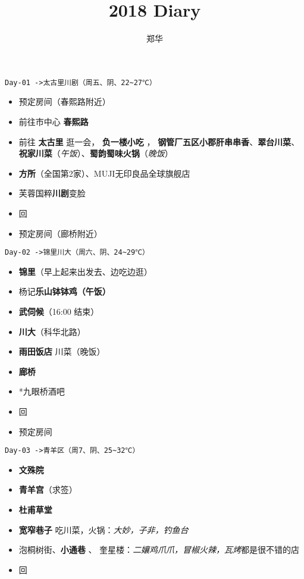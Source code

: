 \documentclass[UTF8,a4paper,8pt]{ctexart}
\author{郑华}
\title{2018 Diary}
\begin{document}
 



 \newpage

 
 
 \newpage
 \verb|Day-01 ->太古里川剧（周五、阴、22~27℃）|
 \begin{itemize}[itemindent = 2em]
 	\item 预定房间（春熙路附近）
 	\item 前往市中心 \textbf{春熙路}
 	\item 前往 \textbf{太古里} 逛一会， \textbf{负一楼小吃} ， \textbf{钢管厂五区小郡肝串串香}、\textbf{翠台川菜}、\textbf{祝家川菜}（\textit{午饭}）、\textbf{蜀韵蜀味火锅}（\textit{晚饭}）
 	\item \textbf{方所}（全国第2家）、MUJI无印良品全球旗舰店
 	\item 芙蓉国粹\textbf{川剧}变脸 	
 	\item 回 	
 	\item 预定房间（廊桥附近）
 \end{itemize}
 
 \verb|Day-02 ->锦里川大（周六、阴、24~29℃）|
 \begin{itemize}[itemindent = 2em]
 	\item \textbf{锦里}（早上起来出发去、边吃边逛）
 	\item 杨记\textbf{乐山钵钵鸡（午饭）} 
 	\item \textbf{武伺候}（16:00 结束）
 	\item \textbf{川大}（科华北路）
 	\item \textbf{雨田饭店} 川菜（晚饭）
 	\item \textbf{廊桥}
 	\item *九眼桥酒吧
 	\item 回
 	\item 预定房间
 \end{itemize}
 
 \verb|Day-03 ->青羊区（周7、阴、25~32℃）|
 \begin{itemize}[itemindent = 2em]
 	\item \textbf{文殊院}
 	\item \textbf{青羊宫}（求签）
 	\item \textbf{杜甫草堂}		 	 	
 	\item \textbf{宽窄巷子} 吃川菜，火锅：\textit{大妙，子非，钓鱼台}
 	\item 泡桐树街、\textbf{小通巷}	、 奎星楼：\textit{二孃鸡爪爪，冒椒火辣，瓦烤}都是很不错的店
 	\item 回	 	
 \end{itemize}
 
\end{document}
